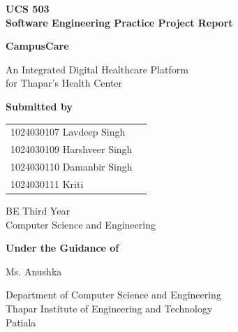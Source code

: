 \documentclass{tietreport}
\begin{document}

\begin{titlepage}

\thispagestyle{empty}

\begin{center}


{\large\bfseries
UCS 503\\
Software Engineering Practice Project Report
}

\vspace{2.0cm}

{\Huge\bfseries CampusCare}

\vspace{0.6cm}

{\large
An Integrated Digital Healthcare Platform\\
for Thapar's Health Center
}

\vspace{2.0cm}

{\large\bfseries Submitted by}

\vspace{0.6cm}

\begin{tabular}{ll}
1024030107 Lavdeep Singh \\
1024030109 Harshveer Singh \\
1024030110 Damanbir Singh \\
1024030111 Kriti
\end{tabular}

\vspace{1.2cm}

{\large
BE Third Year\\
Computer Science and Engineering
}

\vspace{1.2cm}

{\large\bfseries Under the Guidance of}

\vspace{0.5cm}

{\large
Ms. Anushka
}

\vfill

{\large
Department of Computer Science and Engineering\\
Thapar Institute of Engineering and Technology\\
Patiala
}

\end{center}

\end{titlepage}
\end{document}
